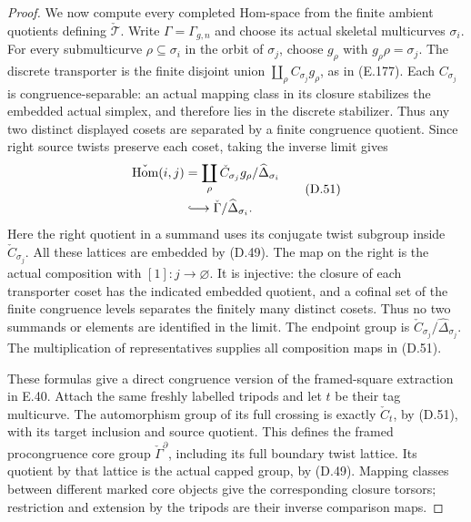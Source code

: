 \begin{proof}
We now compute every completed Hom-space from the finite
ambient quotients defining $\check{\mathcal T}$.  Write
$\Gamma=\Gamma_{g,n}$ and choose its actual skeletal
multicurves $\sigma_i$.  For every submulticurve
$\rho\subseteq\sigma_i$ in the orbit of $\sigma_j$,
choose $g_\rho$ with $g_\rho\rho=\sigma_j$.  The
discrete transporter is the finite disjoint union
$\coprod_\rho C_{\sigma_j}g_\rho$, as in (E.177).
Each $C_{\sigma_j}$ is congruence-separable: an actual
mapping class in its closure stabilizes the embedded
actual simplex, and therefore lies in the discrete
stabilizer.  Thus any two distinct displayed cosets
are separated by a finite congruence quotient.
Since right source twists preserve each coset,
taking the inverse limit gives
\[
 \begin{aligned}
 \check\Hom(i,j)&=
 \coprod_\rho
       \check C_{\sigma_j}g_\rho/\widehat\Delta_{\sigma_i}\\
 &\lhook\joinrel\longrightarrow
       \check\Gamma/\widehat\Delta_{\sigma_i}.
 \end{aligned}                                               \tag{D.51}
\]
Here the right quotient in a summand uses its conjugate
twist subgroup inside $\check C_{\sigma_j}$.  All these
lattices are embedded by (D.49).  The map on the right
is the actual composition with $[1]:j\to\varnothing$.
It is injective: the closure of each transporter
coset has the indicated embedded quotient, and a
cofinal set of the finite congruence levels separates
the finitely many distinct cosets.  Thus no two
summands or elements are identified in the limit.  The endpoint group is
$\check C_{\sigma_j}/\widehat\Delta_{\sigma_j}$.
The multiplication of representatives supplies all
composition maps in (D.51).

These formulas give a direct congruence version of the
framed-square extraction in E.40.  Attach the same
freshly labelled tripods and let $t$ be their tag
multicurve.  The automorphism group of its full
crossing is exactly $\check C_t$, by (D.51), with
its target inclusion and source quotient.  This
defines the framed procongruence core group
$\check\Gamma^{\partial}$, including its full
boundary twist lattice.  Its quotient by that
lattice is the actual capped group, by (D.49).
Mapping classes between different marked core
objects give the corresponding closure torsors;
restriction and extension by the tripods are their
inverse comparison maps.


\end{proof}
